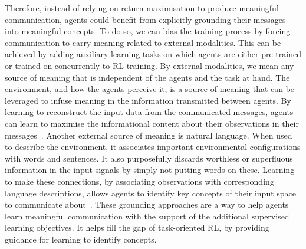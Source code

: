 Therefore, instead of relying on return maximisation to produce meaningful communication, agents could benefit from explicitly grounding their messages into meaningful concepts. To do so, we can bias the training process by forcing communication to carry meaning related to external modalities. This can be achieved by adding auxiliary learning tasks on which agents are either pre-trained or trained on concurrently to RL training. By external modalities, we mean any source of meaning that is independent of the agents and the task at hand. The environment, and how the agents perceive it, is a source of meaning that can be leveraged to infuse meaning in the information transmitted between agents. By learning to reconstruct the input data from the communicated messages, agents can learn to maximise the informational content about their observations in their messages~\citep{Lowe2020_S2P, Lin2021_GroundMAC, Karten2023_CompoConcept, Karten2023_IMGSMAC}. Another external source of meaning is natural language. When used to describe the environment, it associates important environmental configurations with words and sentences. It also purposefully discards worthless or superfluous information in the input signals by simply not putting words on these. Learning to make these connections, by associating observations with corresponding language descriptions, allows agents to identify key concepts of their input space to communicate about~\citep{Lazaridou2017_EmergNaturalLang, Das2017_CoopVisDial, Havrylov2017_EmergenceLang, Lazaridou2020_MACNatLang, Tucker2021_DiscreteEC}. These grounding approaches are a way to help agents learn meaningful communication with the support of the additional supervised learning objectives. It helps fill the gap of task-oriented RL, by providing guidance for learning to identify concepts.



